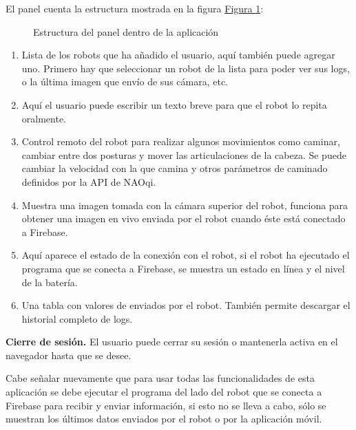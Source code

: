 El panel cuenta la estructura mostrada en la figura \hyperref[\detokenize{users_docs:webappstruct}]{Figura \ref{\detokenize{users_docs:webappstruct}}}:

\begin{figure}[htbp]
\centering
\capstart

\noindent{}
\caption{Estructura del panel dentro de la aplicación}\label{\detokenize{users_docs:webappstruct}}\end{figure}
\begin{enumerate}
\item {} 
Lista de los robots que ha añadido el usuario, aquí también puede agregar uno. Primero hay que seleccionar un robot de la lista para poder ver sus logs, o la última imagen que envío de sus cámara, etc.

\item {} 
Aquí el usuario puede escribir un texto breve para que el robot lo repita oralmente.

\item {} 
Control remoto del robot para realizar algunos movimientos como caminar, cambiar entre dos posturas y mover las articulaciones de la cabeza. Se puede cambiar la velocidad con la que camina y otros parámetros de caminado definidos por la API de NAOqi.

\item {} 
Muestra una imagen tomada con la cámara superior del robot, funciona para obtener una imagen en vivo enviada por el robot cuando éste está conectado a Firebase.

\item {} 
Aquí aparece el estado de la conexión con el robot, si el robot ha ejecutado el programa que se conecta a Firebase, se muestra un estado en línea y el nivel de la batería.

\item {} 
Una tabla con valores de  enviados por el robot. También permite descargar el historial completo de logs.

\end{enumerate}


\textbf{Cierre de sesión.}
\label{\detokenize{users_docs:cierre-de-sesion}}
El usuario puede cerrar su sesión o mantenerla activa en el navegador
hasta que se desee.

Cabe señalar nuevamente que para usar todas las funcionalidades de esta
aplicación se debe ejecutar el programa del lado del robot que se conecta a
Firebase para recibir y enviar información, si esto no se lleva a cabo, sólo
se muestran los últimos datos enviados por el robot o por la aplicación móvil.

